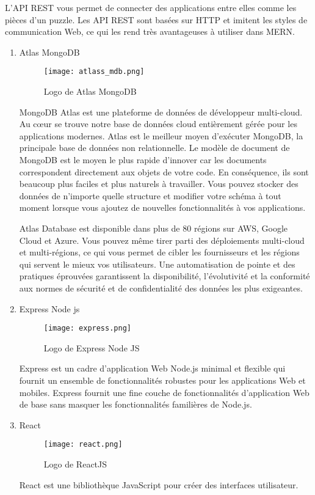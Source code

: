     L'API REST vous permet de connecter des applications entre elles comme les pièces d'un puzzle. Les API REST sont basées sur HTTP et imitent les styles de communication Web, ce qui les rend très avantageuses à utiliser dans MERN.
    \begin{enumerate}\bfseries
        \item Atlas MongoDB\newline
        \begin{figure}[H]
            \centering
            \texttt{[image: atlass\_mdb.png]}
            \caption{Logo de Atlas MongoDB}\label{fig:atlass_mdb}
        \end{figure}
        \normalfont
        MongoDB Atlas est une plateforme de données de développeur multi-cloud. Au cœur se trouve notre base de données cloud entièrement gérée pour les applications modernes. Atlas est le meilleur moyen d'exécuter MongoDB, la principale base de données non relationnelle. Le modèle de document de MongoDB est le moyen le plus rapide d'innover car les documents correspondent directement aux objets de votre code. En conséquence, ils sont beaucoup plus faciles et plus naturels à travailler. Vous pouvez stocker des données de n'importe quelle structure et modifier votre schéma à tout moment lorsque vous ajoutez de nouvelles fonctionnalités à vos applications.

        Atlas Database est disponible dans plus de 80 régions sur AWS, Google Cloud et Azure. Vous pouvez même tirer parti des déploiements multi-cloud et multi-régions, ce qui vous permet de cibler les fournisseurs et les régions qui servent le mieux vos utilisateurs. Une automatisation de pointe et des pratiques éprouvées garantissent la disponibilité, l'évolutivité et la conformité aux normes de sécurité et de confidentialité des données les plus exigeantes.
        \bfseries
        \item Express Node js\newline
        \begin{figure}[H]
            \centering
            \texttt{[image: express.png]}
            \caption{Logo de Express Node JS}\label{fig:express}
        \end{figure}
        \normalfont
        Express est un cadre d'application Web Node.js minimal et flexible qui fournit un ensemble  de fonctionnalités robustes pour les applications Web et mobiles. 
        Express fournit une fine couche de fonctionnalités d'application Web de base sans masquer les fonctionnalités familières de Node.js.
        \bfseries
        \item React\newline
        \begin{figure}[H]
            \centering
            \texttt{[image: react.png]}
            \caption{Logo de ReactJS}\label{fig:react}
        \end{figure}
        \normalfont
        React est une bibliothèque JavaScript pour créer des interfaces utilisateur. 


\end{enumerate}
